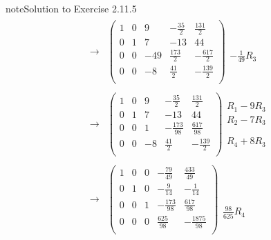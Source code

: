 \documentclass[letterpaper,10pt,english]{jupyterBook}
\begin{document}
\begin{sphinxadmonition}{note}{Solution to Exercise 2.11.5}
\begin{equation*}
\begin{split}
\begin{align*}
    \longrightarrow 
    & \left( \begin{array}{cccc|c} 
         1 & 0 & 9 & - \frac{35}{2} & \frac{131}{2} \\ 
         0 & 1 & 7 & -13 & 44 \\ 
         0 & 0 & -49 & \frac{173}{2} & - \frac{617}{2} \\ 
         0 & 0 & -8 & \frac{41}{2} & - \frac{139}{2} \\ 
    \end{array} \right) 
    \begin{array}{l} \phantom{x} \\ \phantom{x} \\ - \frac{1}{49} R_{3}\\ \phantom{x} \end{array} \\ \\ 
    \longrightarrow 
    & \left( \begin{array}{cccc|c} 
         1 & 0 & 9 & - \frac{35}{2} & \frac{131}{2} \\ 
         0 & 1 & 7 & -13 & 44 \\ 
         0 & 0 & 1 & - \frac{173}{98} & \frac{617}{98} \\ 
         0 & 0 & -8 & \frac{41}{2} & - \frac{139}{2} \\ 
    \end{array} \right) 
    \begin{array}{l} R_{1} - 9 R_{3} \\ R_{2} - 7 R_{3} \\ \phantom{x} \\ R_{4} + 8 R_{3}\end{array} \\ \\ 
    \longrightarrow 
    & \left( \begin{array}{cccc|c} 
         1 & 0 & 0 & - \frac{79}{49} & \frac{433}{49} \\ 
         0 & 1 & 0 & - \frac{9}{14} & - \frac{1}{14} \\ 
         0 & 0 & 1 & - \frac{173}{98} & \frac{617}{98} \\ 
         0 & 0 & 0 & \frac{625}{98} & - \frac{1875}{98} \\ 
    \end{array} \right) 
    \begin{array}{l} \phantom{x} \\ \phantom{x} \\ \phantom{x} \\ \frac{98}{625} R_{4}\end{array} \\ \\ 

\end{align*}
\end{split}
\end{equation*}
\end{sphinxadmonition}
\end{document}
